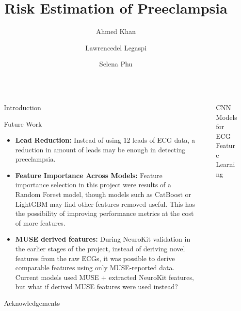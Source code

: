 \documentclass[final]{beamer}
\title{Risk Estimation of Preeclampsia}
\author{Ahmed Khan \and Lawrencedel Legaspi \and Selena Phu}
\institute[shortinst]{Department of Electrical and Computer Engineering}
\newlength{\sepwidth}
\newlength{\colwidth}
\newcommand{\separatorcolumn}{\begin{column}{\sepwidth}\end{column}}
\begin{document}
\begin{frame}[t]
\begin{columns}[t]
\separatorcolumn

\begin{column}{\colwidth}

  \begin{block}{Introduction}
    
  \end{block}

  \begin{block}{Future Work}
    \begin{itemize}
      \item \textbf{Lead Reduction:} Instead of using 12 leads of ECG data, a reduction in amount of leads may be enough in detecting preeclampsia.
      \item \textbf{Feature Importance Across Models:} Feature importance selection in this project were results of a Random Forest model, though models such as CatBoost or LightGBM may find other features removed useful. This has the possibility of improving performance metrics at the cost of more features.
      \item \textbf{MUSE derived features:} During NeuroKit validation in the earlier stages of the project, instead of deriving novel features from the raw ECGs, it was possible to derive comparable features using only MUSE-reported data. Current models used MUSE + extracted NeuroKit features, but what if derived MUSE features were used instead?
    \end{itemize}
  \end{block}

  \begin{block}{Acknowledgements}
    
  \end{block}

\end{column}

\separatorcolumn

\begin{column}{\colwidth}

  \begin{block}{CNN Models for ECG Feature Learning}
  \end{block}


\end{column}
\end{columns}
\end{frame}
\end{document}
